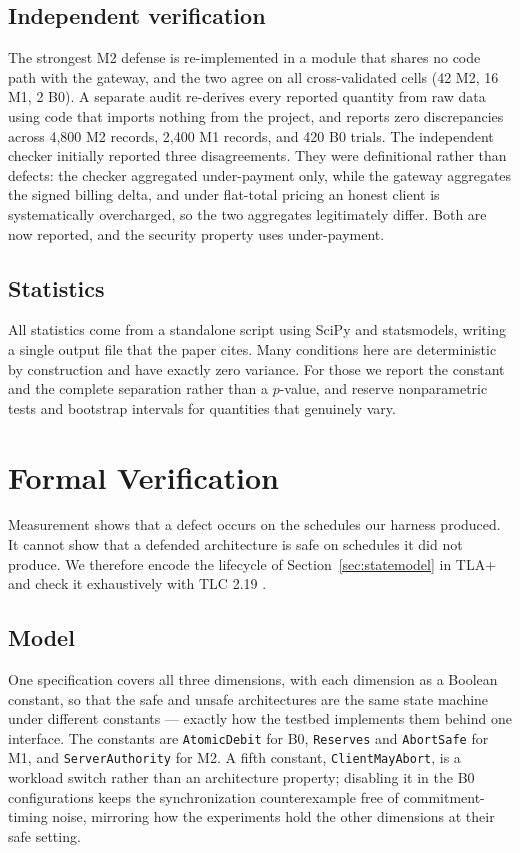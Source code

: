 \documentclass[preprint,3p,authoryear,12pt]{elsarticle}
\begin{document}
\subsection{Independent verification}
The strongest M2 defense is re-implemented in a module that shares no code path with the
gateway, and the two agree on all cross-validated cells (42 M2, 16 M1, 2 B0). A separate
audit re-derives every reported quantity from raw data using code that imports nothing
from the project, and reports zero discrepancies across 4{,}800 M2 records, 2{,}400 M1
records, and 420 B0 trials. The independent checker initially reported three
disagreements. They were definitional rather than defects: the checker aggregated
under-payment only, while the gateway aggregates the signed billing delta, and under
flat-total pricing an honest client is systematically overcharged, so the two aggregates
legitimately differ. Both are now reported, and the security property uses under-payment.

\subsection{Statistics}
All statistics come from a standalone script using SciPy and statsmodels, writing a
single output file that the paper cites. Many conditions here are deterministic by
construction and have exactly zero variance. For those we report the constant and the
complete separation rather than a $p$-value, and reserve nonparametric tests and
bootstrap intervals for quantities that genuinely vary.

\section{Formal Verification}
\label{sec:formal}
Measurement shows that a defect occurs on the schedules our harness produced. It cannot
show that a defended architecture is safe on schedules it did not produce. We therefore
encode the lifecycle of Section~\ref{sec:statemodel} in TLA+ \citep{tla} and check it
exhaustively with TLC 2.19 \citep{tlc}.

\subsection{Model}
One specification covers all three dimensions, with each dimension as a Boolean constant,
so that the safe and unsafe architectures are the same state machine under different
constants --- exactly how the testbed implements them behind one interface. The constants
are \texttt{AtomicDebit} for B0, \texttt{Reserves} and \texttt{AbortSafe} for M1, and
\texttt{ServerAuthority} for M2. A fifth constant, \texttt{ClientMayAbort}, is a workload
switch rather than an architecture property; disabling it in the B0 configurations keeps
the synchronization counterexample free of commitment-timing noise, mirroring how the
experiments hold the other dimensions at their safe setting.
\end{document}
